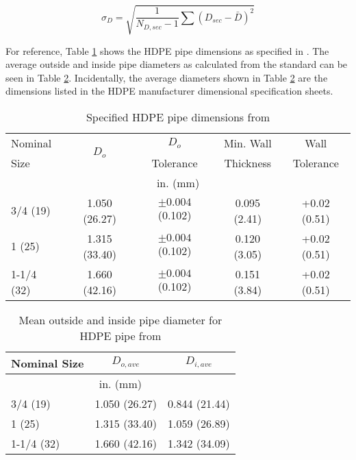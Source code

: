 \begin{equation}
	\sigma_{D} = \sqrt{\frac{1}{N_{D,sec}-1} \sum (D_{sec} - \bar{D})^2}
	\label{eq:ExpResult:Uncertainty:STDEV}
\end{equation}

For reference, Table \ref{tab:ExpResult:Uncertainty:ASTMPipe} shows the HDPE pipe dimensions as specified in \cite{ASTMD3035}. The average outside and inside pipe diameters as calculated from the standard can be seen in Table \ref{tab:ExpResult:Uncertainty:AveDia}. Incidentally, the average diameters shown in Table \ref{tab:ExpResult:Uncertainty:AveDia} are the dimensions listed in the HDPE manufacturer dimensional specification sheets.

\begin{table}[h]
	\centering
	\caption{Specified HDPE pipe dimensions from \cite{ASTMD3035}}
	\label{tab:ExpResult:Uncertainty:ASTMPipe}
	\begin{tabular}{p{2.5cm} | c c c c}
	\hline
	Nominal & \multirow{2}{*}{$D_o$} & $D_o$ & Min. Wall & Wall \\
	Size & & Tolerance & Thickness & Tolerance \\
	\hline	
	\multicolumn{5}{c}{in. (mm)} \\
	\hline\hline
	3/4 (19) & 1.050 (26.27) & $\pm 0.004$ (0.102) & 0.095 (2.41) & +0.02 (0.51) \\
	\hline
	1 (25) & 1.315 (33.40) & $\pm 0.004$ (0.102) & 0.120 (3.05) & +0.02 (0.51) \\
	\hline
	1-1/4 (32) & 1.660 (42.16) & $\pm 0.004$ (0.102) & 0.151 (3.84) & +0.02 (0.51) \\
	\hline
	\end{tabular}
\end{table}

\begin{table}[h]
	\centering
	\caption{Mean outside and inside pipe diameter for HDPE pipe from \cite{ASTMD3035}}
	\label{tab:ExpResult:Uncertainty:AveDia}
	\begin{tabular}{l | c c}
	\hline	
	Nominal Size & $D_{o,ave}$ & $D_{i,ave}$ \\
	\hline
	\multicolumn{3}{c}{in. (mm)} \\
	\hline\hline
	3/4 (19) & 1.050 (26.27) & 0.844 (21.44) \\
	\hline
	1 (25) & 1.315 (33.40) & 1.059 (26.89) \\
	\hline
	1-1/4 (32) & 1.660 (42.16) & 1.342 (34.09)\\
	\end{tabular}
\end{table}

